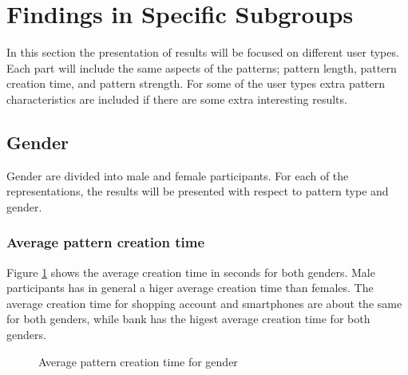 \section{Findings in Specific Subgroups}

  In this section the presentation of results will be focused on different user types. Each part will include the same aspects of the patterns; pattern length, pattern creation time, and pattern strength. For some of the user types extra pattern characteristics are included if there are some extra interesting results. 

	\subsection{Gender}

    Gender are divided into male and female participants. For each of the representations, the results will be presented with respect to pattern type and gender. 

    \subsubsection{Average pattern creation time}

    Figure \ref{fig:avgcreationtimegender} shows the average creation time in seconds for both genders. Male participants has in general a higer average creation time than females. The average creation time for shopping account and smartphones are about the same for both genders, while bank has the higest average creation time for both genders. 

    \begin{figure}[H]
      \centering
      \caption{Average pattern creation time for gender}
      \label{fig:avgcreationtimegender}
    \end{figure}

